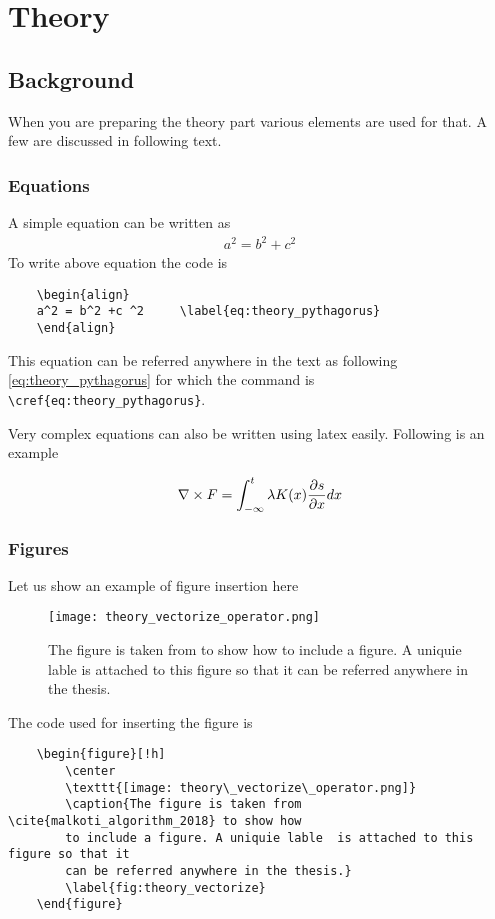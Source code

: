 \chapter{Theory}

\section{Background}
When you are preparing the theory part various elements are used for that. A few are discussed in following text. 


\subsection{Equations}
	A simple equation can be written as 
	\begin{align}
		a^2 = b^2 +c ^2     \label{eq:theory_pythagorus}
	\end{align}
	To write above equation the code is 
	\begin{verbatim}
	\begin{align}
	a^2 = b^2 +c ^2     \label{eq:theory_pythagorus}
	\end{align}
	\end{verbatim}
	This equation can be referred anywhere in the text as following \cref{eq:theory_pythagorus} for which the command is  \verb|\cref{eq:theory_pythagorus}|.


	Very complex equations can also be written using latex easily. 
	Following is an example
	
	\begin{align}
		\nabla \times F = \int_{-\infty}^{t} \lambda K(x) \pdv{s}{x} dx
	\end{align}
	


\subsection{Figures}
	Let us show an example of figure insertion here
	\begin{figure}[!h]
		\center
		\texttt{[image: theory\_vectorize\_operator.png]}
		\caption{The figure is taken from  \cite{malkoti_algorithm_2018} 
			to show how to include a figure. 
			A uniquie lable  is attached to this figure so that it can be 
			referred anywhere in the thesis.}
		\label{fig:theory_vectorize}
	\end{figure}

	The code used for inserting the figure is 
	\begin{verbatim}	
	\begin{figure}[!h]
		\center
		\texttt{[image: theory\_vectorize\_operator.png]}
		\caption{The figure is taken from  \cite{malkoti_algorithm_2018} to show how 
		to include a figure. A uniquie lable  is attached to this figure so that it 
		can be referred anywhere in the thesis.}
		\label{fig:theory_vectorize}
	\end{figure}
	\end{verbatim}
	
